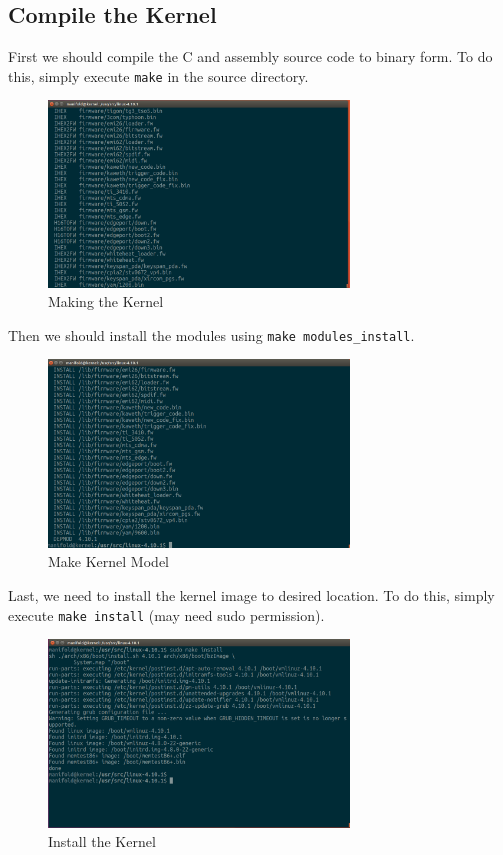 \documentclass{article}
\begin{document}
\subsection{Compile the Kernel}
First we should compile the C and assembly source code to binary form. To do this, simply execute \texttt{make} in the source directory.
\begin{figure}[H]
\centering
\includegraphics[width=8cm]{make.png}
\caption{Making the Kernel}
\end{figure}
Then we should install the modules using \texttt{make modules\_install}.
\begin{figure}[H]
\centering
\includegraphics[width=8cm]{makemod.png}
\caption{Make Kernel Model}
\end{figure}
Last, we need to install the kernel image to desired location. To do this, simply execute \texttt{make install} (may need sudo permission).
\begin{figure}[H]
\centering
\includegraphics[width=8cm]{makeinstall.png}
\caption{Install the Kernel}
\end{figure}
\end{document}
